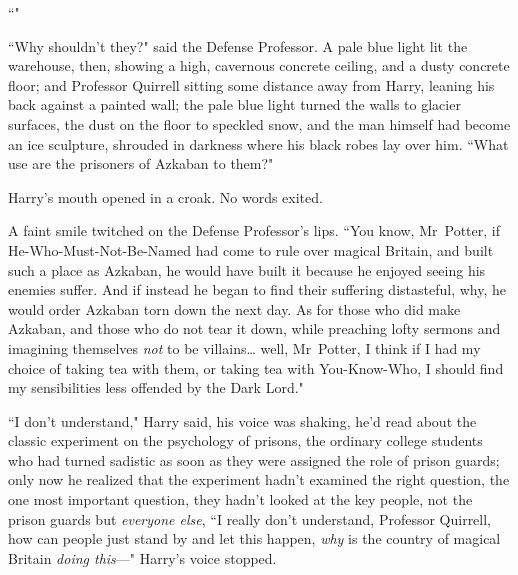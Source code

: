``"

``Why shouldn't they?" said the Defense Professor. A pale blue light lit the warehouse, then, showing a high, cavernous concrete ceiling, and a dusty concrete floor; and Professor Quirrell sitting some distance away from Harry, leaning his back against a painted wall; the pale blue light turned the walls to glacier surfaces, the dust on the floor to speckled snow, and the man himself had become an ice sculpture, shrouded in darkness where his black robes lay over him. ``What use are the prisoners of Azkaban to them?"

Harry's mouth opened in a croak. No words exited.

A faint smile twitched on the Defense Professor's lips. ``You know, Mr~Potter, if He-Who-Must-Not-Be-Named had come to rule over magical Britain, and built such a place as Azkaban, he would have built it because he enjoyed seeing his enemies suffer. And if instead he began to find their suffering distasteful, why, he would order Azkaban torn down the next day. As for those who did make Azkaban, and those who do not tear it down, while preaching lofty sermons and imagining themselves \emph{not} to be villains{\ldots} well, Mr~Potter, I think if I had my choice of taking tea with them, or taking tea with You-Know-Who, I should find my sensibilities less offended by the Dark Lord."

``I don't understand," Harry said, his voice was shaking, he'd read about the classic experiment on the psychology of prisons, the ordinary college students who had turned sadistic as soon as they were assigned the role of prison guards; only now he realized that the experiment hadn't examined the right question, the one most important question, they hadn't looked at the key people, not the prison guards but \emph{everyone else}, ``I really don't understand, Professor Quirrell, how can people just stand by and let this happen, \emph{why} is the country of magical Britain \emph{doing this}—" Harry's voice stopped.

